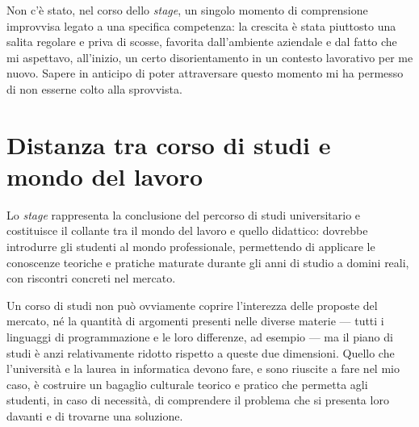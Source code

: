 Non c'è stato, nel corso dello \textit{stage}, un singolo momento di comprensione improvvisa legato a una specifica competenza: la crescita è stata piuttosto una salita regolare e priva di scosse, favorita dall'ambiente aziendale e dal fatto che mi aspettavo, all'inizio, un certo disorientamento in un contesto lavorativo per me nuovo. Sapere in anticipo di poter attraversare questo momento mi ha permesso di non esserne colto alla sprovvista.

\section{Distanza tra corso di studi e mondo del lavoro}
 
 
Lo \textit{stage} rappresenta la conclusione del percorso di studi universitario e costituisce il collante tra il mondo del lavoro e quello didattico: dovrebbe introdurre gli studenti al mondo professionale, permettendo di applicare le conoscenze teoriche e pratiche maturate durante gli anni di studio a domini reali, con riscontri concreti nel mercato.
 
Un corso di studi non può ovviamente coprire l'interezza delle proposte del mercato, né la quantità di argomenti presenti nelle diverse materie — tutti i linguaggi di programmazione e le loro differenze, ad esempio — ma il piano di studi è anzi relativamente ridotto rispetto a queste due dimensioni. Quello che l'università e la laurea in informatica devono fare, e sono riuscite a fare nel mio caso, è costruire un bagaglio culturale teorico e pratico che permetta agli studenti, in caso di necessità, di comprendere il problema che si presenta loro davanti e di trovarne una soluzione.
 
